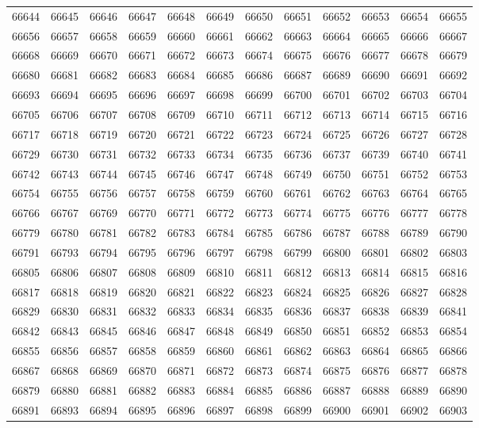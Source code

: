 \begin{center}
\begin{longtable}{llllllllllll}
66644 &66645 &66646 &66647 &66648 &66649 &66650 &66651 &66652 &66653 &66654 &66655 \\
66656 &66657 &66658 &66659 &66660 &66661 &66662 &66663 &66664 &66665 &66666 &66667 \\
66668 &66669 &66670 &66671 &66672 &66673 &66674 &66675 &66676 &66677 &66678 &66679 \\
66680 &66681 &66682 &66683 &66684 &66685 &66686 &66687 &66689 &66690 &66691 &66692 \\
66693 &66694 &66695 &66696 &66697 &66698 &66699 &66700 &66701 &66702 &66703 &66704 \\
66705 &66706 &66707 &66708 &66709 &66710 &66711 &66712 &66713 &66714 &66715 &66716 \\
66717 &66718 &66719 &66720 &66721 &66722 &66723 &66724 &66725 &66726 &66727 &66728 \\
66729 &66730 &66731 &66732 &66733 &66734 &66735 &66736 &66737 &66739 &66740 &66741 \\
66742 &66743 &66744 &66745 &66746 &66747 &66748 &66749 &66750 &66751 &66752 &66753 \\
66754 &66755 &66756 &66757 &66758 &66759 &66760 &66761 &66762 &66763 &66764 &66765 \\
66766 &66767 &66769 &66770 &66771 &66772 &66773 &66774 &66775 &66776 &66777 &66778 \\
66779 &66780 &66781 &66782 &66783 &66784 &66785 &66786 &66787 &66788 &66789 &66790 \\
66791 &66793 &66794 &66795 &66796 &66797 &66798 &66799 &66800 &66801 &66802 &66803 \\
66805 &66806 &66807 &66808 &66809 &66810 &66811 &66812 &66813 &66814 &66815 &66816 \\
66817 &66818 &66819 &66820 &66821 &66822 &66823 &66824 &66825 &66826 &66827 &66828 \\
66829 &66830 &66831 &66832 &66833 &66834 &66835 &66836 &66837 &66838 &66839 &66841 \\
66842 &66843 &66845 &66846 &66847 &66848 &66849 &66850 &66851 &66852 &66853 &66854 \\
66855 &66856 &66857 &66858 &66859 &66860 &66861 &66862 &66863 &66864 &66865 &66866 \\
66867 &66868 &66869 &66870 &66871 &66872 &66873 &66874 &66875 &66876 &66877 &66878 \\
66879 &66880 &66881 &66882 &66883 &66884 &66885 &66886 &66887 &66888 &66889 &66890 \\
66891 &66893 &66894 &66895 &66896 &66897 &66898 &66899 &66900 &66901 &66902 &66903 \\

\end{longtable}
\end{center}
